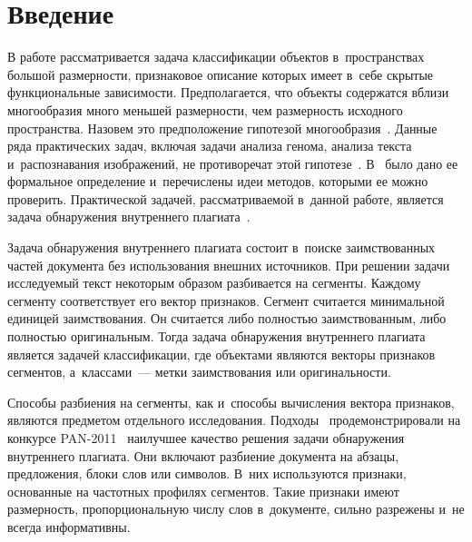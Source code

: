 \vspace*{6pt}



\thispagestyle{headings}

\begin{multicols}{2}

\label{st\stat}

\section{Введение}

В работе рассматривается задача классификации объектов в~пространствах большой 
раз\-мер\-ности, признаковое описание которых имеет в~себе скрытые функциональные 
зависимости.
Предполагается, что объекты содержатся вблизи многообразия много меньшей размерности, 
чем размерность исходного пространства. Назовем это предположение гипотезой 
многообразия~\cite{fefferman2016testing}. Данные ряда практических задач, включая 
задачи анализа генома, анализа текста и~распознавания изображений, не противоречат 
этой гипотезе~\cite{maaten2008visualizing}. В~\cite{narayanan2010sample} было 
дано ее формальное определение и~перечислены идеи методов, которыми ее можно 
проверить. Практической задачей, рассматриваемой в~данной работе, является задача 
обнаружения внутреннего плагиата~\cite{zu2006intrinsic, kuznetsov2016methods}.

Задача обнаружения внутреннего плагиата состоит в~поиске заимствованных частей 
документа без использования внешних источников. При решении задачи исследуемый 
текст некоторым образом разбивается на сегменты. Каждому сегменту соответствует 
его вектор признаков. Сегмент считается минимальной единицей заимствования. Он считается 
либо полностью заимствованным, либо полностью оригинальным. Тогда задача обнаружения 
внутреннего плагиата является задачей классификации, где объектами являются векторы 
признаков сегментов, а~классами~--- метки заимствования или оригинальности.

Способы разбиения на сегменты, как и~способы вычисления вектора признаков, являются 
предметом отдельного исследования. 
Подходы~\cite{zu2006intrinsic,muhr2010external,stamatatos2009intrinsic,kestemont2011intrinsic} 
продемонстрировали 
на конкурсе PAN-2011~\cite{potthast2011overview} наилучшее качество решения задачи 
обнаружения внутреннего плагиата. Они включают разбиение документа на абзацы, 
предложения, блоки слов или символов. В~них используются признаки, основанные на 
частотных профилях сегментов. Такие признаки имеют размерность, пропорциональную 
числу слов в~документе, сильно разрежены и~не всегда информативны.


\end{multicols}
